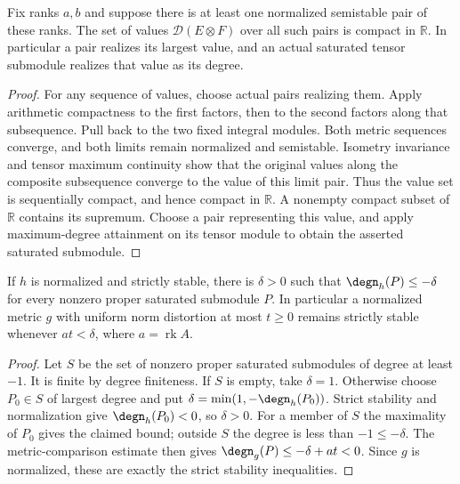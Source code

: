 \begin{lemma}
\label{lem:maximizing-semistable-pair}
\leanok
{}
Fix ranks $a,b$ and suppose there is at least one normalized semistable
pair of these ranks. The set of values $\mathcal D(E\otimes F)$ over
all such pairs is compact in $\mathbb R$. In particular a pair realizes
its largest value, and an actual saturated tensor submodule realizes
that value as its degree.
\end{lemma}
\begin{proof}
For any sequence of values, choose actual pairs realizing them.
Apply arithmetic compactness to the first factors, then to the second
factors along that subsequence. Pull back to the two fixed integral
modules. Both metric sequences converge, and both limits remain normalized
and semistable. Isometry invariance and tensor maximum continuity show
that the original values along the composite subsequence converge to
the value of this limit pair. Thus the value set is sequentially compact,
and hence compact in $\mathbb R$. A nonempty compact subset of
$\mathbb R$ contains its supremum. Choose a pair representing this
value, and apply maximum-degree attainment on its tensor module to
obtain the asserted saturated submodule.
\end{proof}

\begin{lemma}
\label{lem:strict-stability-degree-gap}
\leanok
{}
If $h$ is normalized and strictly stable, there is $\delta>0$ such
that $\degn_h(P)\leq-\delta$ for every nonzero proper saturated
submodule $P$. In particular a normalized metric $g$ with uniform
norm distortion at most $t\geq0$ remains strictly stable whenever
$a t<\delta$, where $a=\operatorname{rk}A$.
\end{lemma}
\begin{proof}
Let $S$ be the set of nonzero proper saturated submodules of degree
at least $-1$. It is finite by degree finiteness. If $S$ is empty,
take $\delta=1$. Otherwise choose $P_0\in S$ of largest degree and
put $\delta=\min(1,-\degn_h(P_0))$. Strict stability and normalization
give $\degn_h(P_0)<0$, so $\delta>0$. For a member of $S$ the
maximality of $P_0$ gives the claimed bound; outside $S$ the degree
is less than $-1\leq-\delta$. The metric-comparison estimate then
gives $\degn_g(P)\leq-\delta+a t<0$. Since $g$ is normalized,
these are exactly the strict stability inequalities.
\end{proof}


